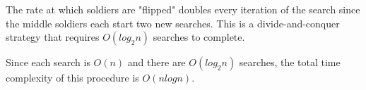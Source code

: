 \documentclass[11pt]{article}
\begin{document}
The rate at which soldiers are "flipped" doubles every iteration of the search since the middle soldiers each start two new searches. This is a divide-and-conquer strategy that requires $O(log_2n)$ searches to complete.

Since each search is $O(n)$ and there are $O(log_2n)$ searches, the total time complexity of this procedure is $O(nlogn)$.
\end{document}
